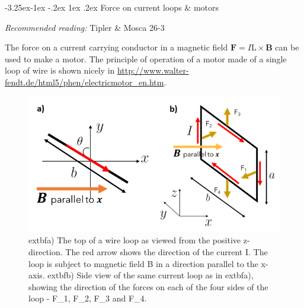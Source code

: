 \documentclass[
]{book}
\makeatletter
\renewcommand\subsection{%
\@startsection{subsection}{2}{\z@}%
              {-3.25ex\@plus -1ex \@minus -.2ex}%
              {1ex \@plus .2ex}%
              {\sffamily\bfseries}}
\numberwithin{equation}{section}
\makeatother
\begin{document}
\hypertarget{force-on-current-loops-motors}{%
\subsection{Force on current loops \& motors}\label{force-on-current-loops-motors}}

\emph{Recommended reading:} Tipler \& Mosca 26-3

The force on a current carrying conductor in a magnetic field
\(\mathbf{F} = I \mathrm{L} \times \mathbf{B}\) can be used to make a motor. The principle of
operation of a motor made of a single loop of wire is shown nicely in
\url{http://www.walter-fendt.de/html5/phen/electricmotor_en.htm}.

\begin{figure}

{\centering \includegraphics[width=0.7\linewidth]{Figures/motor_pics} 

}

\caption{   extbf{a)} The top of a wire loop as viewed from the positive z-direction. The red arrow shows the direction of the current I. The loop is subject to magnetic field B in a direction parallel to the x-axis.    extbf{b)} Side view of the same current loop as in  extbf{a)}, showing the direction of the forces on each of the four sides of the loop - F_1, F_2, F_3 and F_4. }\label{fig:motorPics}
\end{figure}
\end{document}
